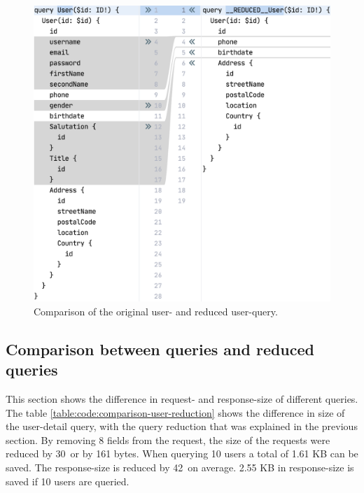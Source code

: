 \ifshowImages
  \begin{figure}[H]
  \centering
  \includegraphics[width=0.6\linewidth]{images/reduction-graphql-examples/compare-user-reduced-user.png}
  \caption{Comparison of the original user- and reduced user-query.}\label{fig:applied-methods:comparison-user-reduced-user}
  \end{figure}
\fi

\subsection{Comparison between queries and reduced queries}

This section shows the difference in request- and response-size of different queries. The table \ref{table:code:comparison-user-reduction} shows the difference in size of the user-detail query, with the query reduction that was explained in the previous section. By removing 8 fields from the request, the size of the requests were reduced by 30\ or by 161 bytes. When querying 10 users a total of 1.61 KB can be saved. The response-size is reduced by 42\ on average. 2.55 KB in response-size is saved if 10 users are queried.

